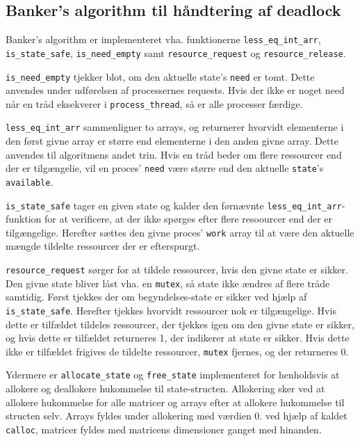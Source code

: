 \subsection{Banker's algorithm til håndtering af deadlock}
Banker's algorithm er implementeret vha. funktionerne \texttt{less\_eq\_int\_arr}, \texttt{is\_state\_safe}, \texttt{is\_need\_empty} samt \texttt{resource\_request} og \texttt{resource\_release}. 

\texttt{is\_need\_empty} tjekker blot, om den aktuelle state's \texttt{need} er tomt. Dette anvendes under udførelsen af processernes requests. Hvis der ikke er noget need når en tråd eksekverer i \texttt{process_thread}, så er alle processer færdige.   

\texttt{less\_eq\_int\_arr} sammenligner to arrays, og returnerer hvorvidt elementerne i den først givne array er større end elementerne i den anden givne array. Dette anvendes til algoritmens andet trin. Hvis en tråd beder om flere ressourcer end der er tilgængelie, vil en proces' \texttt{need} være større end den aktuelle \texttt{state}'s \texttt{available}.

\texttt{is\_state\_safe} tager en given state og kalder den førnævnte \texttt{less\_eq\_int\_arr}-funktion for at verificere, at der ikke spørges efter flere resoourcer end der er tilgængelige. Herefter sættes den givne proces' \texttt{work} array til at være den aktuelle mængde tildelte ressourcer der er efterspurgt. 

\texttt{resource\_request} sørger for at tildele ressourcer, hvis den givne state er sikker. Den givne state bliver låst vha. en \texttt{mutex}, så state ikke ændres af flere tråde samtidig.  
Først tjekkes der om begyndelses-state er sikker ved hjælp af \texttt{is\_state\_safe}. Herefter tjekkes hvorvidt ressourcer nok er tilgængelige. Hvis dette er tilfældet tildeles ressourcer, der tjekkes igen om den givne state er sikker, og hvis dette er tilfældet returneres 1, der indikerer at state er sikker. Hvis dette ikke er tilfældet frigives de tildelte ressourcer, \texttt{mutex} fjernes, og der returneres 0.

Ydermere er \texttt{allocate_state} og \texttt{free_state} implementeret for henholdsvis at allokere og deallokere hukommelse til state-structen. Allokering sker ved at allokere hukommelse for alle matricer og arrays efter at allokere hukommelse til structen selv. Arrays fyldes under allokering med værdien 0. ved hjælp af kaldet \texttt{calloc}, matricer fyldes med matricens dimensioner ganget med hinanden.
